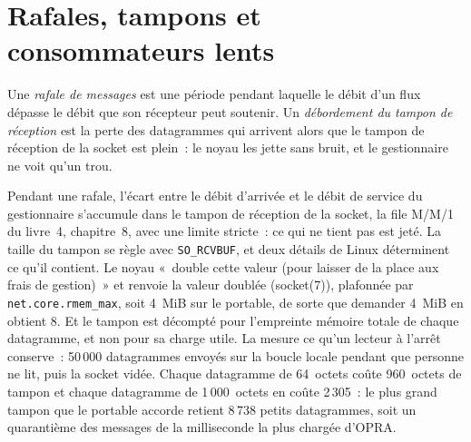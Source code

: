 \section{Rafales, tampons et consommateurs lents}

\begin{definition}\label{def:ll:the-feed-handler:burst}
Une \emph{rafale de messages} est une période pendant laquelle le débit d'un flux dépasse le débit que son récepteur peut soutenir. Un
\emph{débordement du tampon de réception} est la perte des datagrammes qui arrivent alors que le tampon de réception de la
socket est plein~: le noyau les jette sans bruit, et le gestionnaire ne voit qu'un trou.
\end{definition}

Pendant une rafale, l'écart entre le débit d'arrivée et le débit de service du gestionnaire s'accumule dans le tampon de réception de la socket,
la file M/M/1 du livre~4, chapitre~8, avec une limite stricte~: ce qui ne tient pas est jeté. La taille du tampon
se règle avec \texttt{SO\_RCVBUF}, et deux détails de Linux déterminent ce qu'il contient. Le noyau «~double cette valeur (pour
laisser de la place aux frais de gestion)~» et renvoie la valeur doublée (socket(7)), plafonnée par \texttt{net.core.rmem\_max},
soit 4~MiB sur le portable, de sorte que demander 4~MiB en obtient 8. Et le tampon est décompté pour l'empreinte mémoire totale de chaque datagramme,
et non pour sa charge utile. La  mesure ce qu'un lecteur à l'arrêt conserve~: 50\,000 datagrammes envoyés sur
la boucle locale pendant que personne ne lit, puis la socket vidée. Chaque datagramme de 64~octets coûte 960~octets de tampon et chaque datagramme de 1\,000~octets
en coûte 2\,305~: le plus grand tampon que le portable accorde retient 8\,738 petits datagrammes, soit un quarantième des messages de
la milliseconde la plus chargée d'OPRA.

